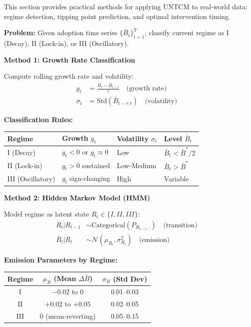 This section provides practical methods for applying UNTCM to real-world data: regime detection, tipping point prediction, and optimal intervention timing.

\begin{tcolorbox}[colback=blue!5!white, colframe=blue!75!black,
    title=\textbf{Application UNTCM-E1: Regime Detection}]

\textbf{Problem:} Given adoption time series $\{\bar{B}_t\}_{t=1}^T$, classify current regime as I (Decay), II (Lock-in), or III (Oscillatory).

\textbf{Method 1: Growth Rate Classification}

Compute rolling growth rate and volatility:
\begin{align}
g_t &= \frac{\bar{B}_{t} - \bar{B}_{t-\tau}}{\tau} \quad \text{(growth rate)} \\
\sigma_t &= \text{Std}(\bar{B}_{t-\tau:t}) \quad \text{(volatility)}
\end{align}

\textbf{Classification Rules:}
\begin{center}
\renewcommand{\arraystretch}{1.3}
\begin{tabular}{@{}llll@{}}
\toprule
\textbf{Regime} & \textbf{Growth $g_t$} & \textbf{Volatility $\sigma_t$} & \textbf{Level $\bar{B}_t$} \\
\midrule
I (Decay) & $g_t < 0$ or $g_t \approx 0$ & Low & $\bar{B}_t < \bar{B}^*/2$ \\
II (Lock-in) & $g_t > 0$ sustained & Low-Medium & $\bar{B}_t > \bar{B}^*$ \\
III (Oscillatory) & $g_t$ sign-changing & High & Variable \\
\bottomrule
\end{tabular}
\end{center}

\textbf{Method 2: Hidden Markov Model (HMM)}

Model regime as latent state $R_t \in \{I, II, III\}$:
\begin{align}
R_t | R_{t-1} &\sim \text{Categorical}(P_{R_{t-1}, \cdot}) \quad \text{(transition)} \\
\bar{B}_t | R_t &\sim \mathcal{N}(\mu_{R_t}, \sigma_{R_t}^2) \quad \text{(emission)}
\end{align}

\textbf{Emission Parameters by Regime:}
\begin{center}
\renewcommand{\arraystretch}{1.2}
\begin{tabular}{@{}ccc@{}}
\toprule
\textbf{Regime} & $\mu_R$ (Mean $\Delta\bar{B}$) & $\sigma_R$ (Std Dev) \\
\midrule
I & $-0.02$ to $0$ & 0.01--0.03 \\
II & $+0.02$ to $+0.05$ & 0.02--0.05 \\
III & $0$ (mean-reverting) & 0.05--0.15 \\
\bottomrule
\end{tabular}
\end{center}


\end{tcolorbox}
